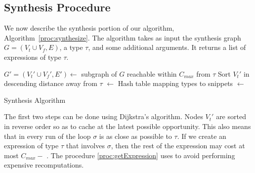 \subsection{Synthesis Procedure}
\label{sec:algorithm:synthesis}
We now describe the synthesis portion of our algorithm, Algorithm~\ref{proc:synthesize}. The algorithm takes as input the synthesis graph $G=(V_t \cup V_f, E)$, a type $\tau$, and some additional arguments. It returns a list of expressions of type $\tau$.
\begin{algorithm}[hbt]
\BlankLine
$G'=(V_t'\cup V_f', E') \longleftarrow$ subgraph of $G$ reachable within $C_{max}$ from $\tau$ \;
Sort $V_t'$ in descending distance away from $\tau$ \;
\Snips $\longleftarrow$ Hash table mapping types to snippets \;
\Exprs $\longleftarrow$ \Snips[$\tau$] \;
\caption{Synthesis Algorithm}\label{proc:synthesize}
\end{algorithm}
The first two steps can be done using Dijkstra's algorithm. Nodes $V_t'$ are sorted in reverse order so as
to cache at the latest possible opportunity. This also means that in every run of the loop 
$\sigma$ is as close as possible to $\tau$. If we
create an expression of type  $\tau$ that involves $\sigma$, then the rest of the expression may cost at most $C_{max} - $
\Dist{$\sigma$}. The procedure \ref{proc:getExpression} uses \Snips to
avoid performing expensive recomputations.

